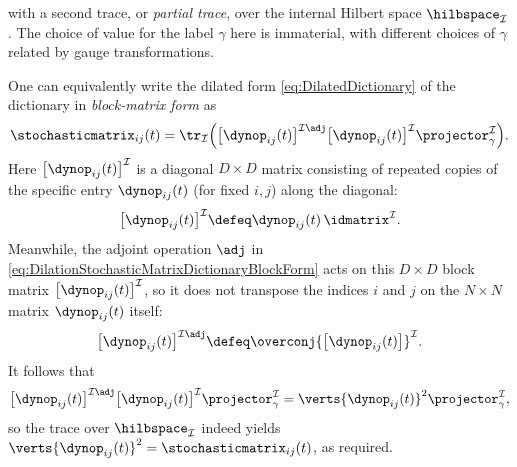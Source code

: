 \documentclass[12pt,english,prl,superscriptaddress,nobibnotes,nofootinbib]{revtex4-2}
\let\originalleft\left
\let\originalright\right
\renewcommand{\left}{\mathopen{}\mathclose\bgroup\originalleft}
\renewcommand{\right}{\aftergroup\egroup\originalright}
\begin{document}
 with a second trace, or \emph{partial trace}, over the internal
Hilbert space $\hilbspace_{\mathcal{I}}$. The choice of value for
the label $\gamma$ here is immaterial, with different choices of
$\gamma$ related by gauge transformations.

One can equivalently write the dilated form \eqref{eq:DilatedDictionary}
of the dictionary in \emph{block-matrix form} as 
\begin{equation}
\stochasticmatrix_{ij}\left(t\right)=\tr_{\mathcal{I}}\left(\left[\dynop_{ij}\left(t\right)\right]^{\mathcal{I}\adj}\left[\dynop_{ij}\left(t\right)\right]^{\mathcal{I}}\projector_{\gamma}^{\mathcal{I}}\right).\label{eq:DilationStochasticMatrixDictionaryBlockForm}
\end{equation}
 Here $\left[\dynop_{ij}\left(t\right)\right]^{\mathcal{I}}$ is
a diagonal $D\times D$ matrix consisting of repeated copies of the
specific entry $\dynop_{ij}\left(t\right)$ (for fixed $i,j$) along
the diagonal: 
\begin{equation}
\left[\dynop_{ij}\left(t\right)\right]^{\mathcal{I}}\defeq\dynop_{ij}\left(t\right)\,\idmatrix^{\mathcal{I}}.\label{eq:DefDilatedBlockTimeEvOp}
\end{equation}
 Meanwhile, the adjoint operation $\adj$ in \eqref{eq:DilationStochasticMatrixDictionaryBlockForm}
acts on this $D\times D$ block matrix $\left[\dynop_{ij}\left(t\right)\right]^{\mathcal{I}}$,
so it does not transpose the indices $i$ and $j$ on the $N\times N$
matrix $\dynop_{ij}\left(t\right)$ itself: 
\begin{equation}
\left[\dynop_{ij}\left(t\right)\right]^{\mathcal{I}\adj}\defeq\overconj{\left[\dynop_{ij}\left(t\right)\right]}^{\mathcal{I}}.\label{eq:DefAdjointDilatedBlockTimeEvOp}
\end{equation}
 It follows that 
\begin{equation}
\left[\dynop_{ij}\left(t\right)\right]^{\mathcal{I}\adj}\left[\dynop_{ij}\left(t\right)\right]^{\mathcal{I}}\projector_{\gamma}^{\mathcal{I}}=\verts{\dynop_{ij}\left(t\right)}^{2}\projector_{\gamma}^{\mathcal{I}},\label{eq:CalculationBlockMatrixForDilatedDictionary}
\end{equation}
 so the trace over $\hilbspace_{\mathcal{I}}$ indeed yields $\verts{\dynop_{ij}\left(t\right)}^{2}=\stochasticmatrix_{ij}\left(t\right)$,
as required.
\end{document}
